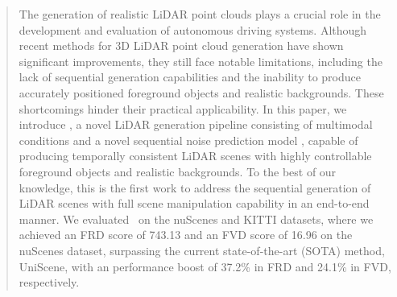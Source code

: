 \begin{abstract}
The generation of realistic LiDAR point clouds plays a crucial role in the development and evaluation of autonomous driving systems. Although recent methods for 3D LiDAR point cloud generation have shown significant improvements, they still face notable limitations, including the lack of sequential generation capabilities and the inability to produce accurately positioned foreground objects and realistic backgrounds. These shortcomings hinder their practical applicability. In this paper, we introduce \sysname, a novel LiDAR generation pipeline consisting of multimodal conditions and a novel sequential noise prediction model \modelname, capable of producing temporally consistent LiDAR scenes with highly controllable foreground objects and realistic backgrounds. To the best of our knowledge, this is the first work to address the sequential generation of LiDAR scenes with full scene manipulation capability in an end-to-end manner. We evaluated \sysname\ on the nuScenes and KITTI datasets, where we achieved an FRD score of 743.13 and an FVD score of 16.96 on the nuScenes dataset, surpassing the current state-of-the-art (SOTA) method, UniScene, with an performance boost of  37.2\% in FRD and 24.1\% in FVD, respectively.


 
 
\end{abstract}



